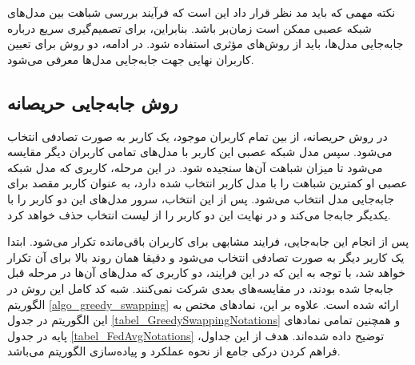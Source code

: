 نکته مهمی که باید مد نظر قرار داد این است که فرآیند بررسی شباهت بین مدل‌های شبکه عصبی ممکن است زمان‌بر باشد. بنابراین، برای تصمیم‌گیری سریع درباره جابه‌جایی مدل‌ها، باید از روش‌های مؤثری استفاده شود. در ادامه، دو روش برای تعیین کاربران نهایی جهت جابه‌جایی مدل‌ها معرفی می‌شود.


\subsection{
	روش جابه‌جایی حریصانه%
}
در روش حریصانه، از بین تمام کاربران موجود، یک کاربر به صورت تصادفی انتخاب می‌شود. سپس مدل شبکه عصبی این کاربر با مدل‌های تمامی کاربران دیگر مقایسه می‌شود تا میزان شباهت آن‌ها سنجیده شود. در این مرحله، کاربری که مدل شبکه عصبی او کمترین شباهت را با مدل کاربر انتخاب‌ شده دارد، به عنوان کاربر مقصد برای جابه‌جایی مدل انتخاب می‌شود. پس از این انتخاب، سرور مدل‌های این دو کاربر را با یکدیگر جابه‌جا می‌کند و در نهایت این دو کاربر را از لیست انتخاب حذف خواهد کرد.

پس از انجام این جابه‌جایی، فرایند مشابهی برای کاربران باقی‌مانده تکرار می‌شود. ابتدا یک کاربر دیگر به صورت تصادفی انتخاب می‌شود و دقیقا همان روند بالا برای آن تکرار خواهد شد، با توجه به این که در این فرایند، دو کاربری که مدل‌های آن‌ها در مرحله قبل جابه‌جا شده بودند، در مقایسه‌های بعدی شرکت نمی‌کنند. شبه کد کامل این روش در الگوریتم
\ref{algo_greedy_swapping}
ارائه شده است. علاوه بر این، نمادهای مختص به این الگوریتم در جدول
\ref{tabel_GreedySwappingNotations}
و همچنین تمامی نمادهای پایه در جدول
\ref{tabel_FedAvgNotations}
توضیح داده شده‌اند.
هدف از این جداول، فراهم کردن درکی جامع از نحوه عملکرد و پیاده‌سازی الگوریتم می‌باشد.


\begin{LTR}
	\begin{algorithm}[t]
		\begin{RTL}
			\caption{%
				جابه‌جایی حریصانه
			}
			\label{algo_greedy_swapping}
		\end{RTL}
		
		\begin{latin}
		\end{latin}
	\end{algorithm}
\end{LTR}


